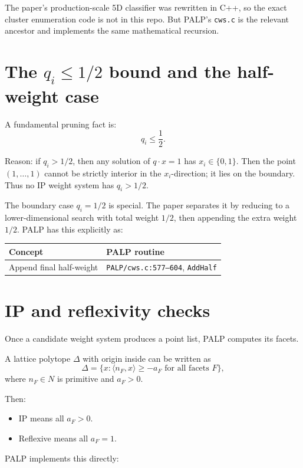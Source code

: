 \documentclass[11pt]{article}
\begin{document}
The paper's production-scale 5D classifier was rewritten in C++, so the exact cluster enumeration code is not in this repo. But PALP's \texttt{cws.c} is the relevant ancestor and implements the same mathematical recursion.

\section{The \(q_i\le 1/2\) bound and the half-weight case}

A fundamental pruning fact is:
\[
q_i\le \frac12.
\]

Reason: if \(q_i>1/2\), then any solution of \(q\cdot x=1\) has \(x_i\in\{0,1\}\). Then the point \((1,\dots,1)\) cannot be strictly interior in the \(x_i\)-direction; it lies on the boundary. Thus no IP weight system has \(q_i>1/2\).

The boundary case \(q_i=1/2\) is special. The paper separates it by reducing to a lower-dimensional search with total weight \(1/2\), then appending the extra weight \(1/2\). PALP has this explicitly as:

\begin{center}
\begin{tabular}{@{}ll@{}}
\toprule
Concept & PALP routine \\
\midrule
Append final half-weight & \texttt{PALP/cws.c:577--604}, \texttt{AddHalf} \\
\bottomrule
\end{tabular}
\end{center}

\section{IP and reflexivity checks}

Once a candidate weight system produces a point list, PALP computes its facets.

A lattice polytope \(\Delta\) with origin inside can be written as
\[
\Delta=\{x:\langle n_F,x\rangle\ge -a_F\text{ for all facets }F\},
\]
where \(n_F\in N\) is primitive and \(a_F>0\).

Then:
\begin{itemize}
  \item IP means all \(a_F>0\).
  \item Reflexive means all \(a_F=1\).
\end{itemize}

PALP implements this directly:
\end{document}
